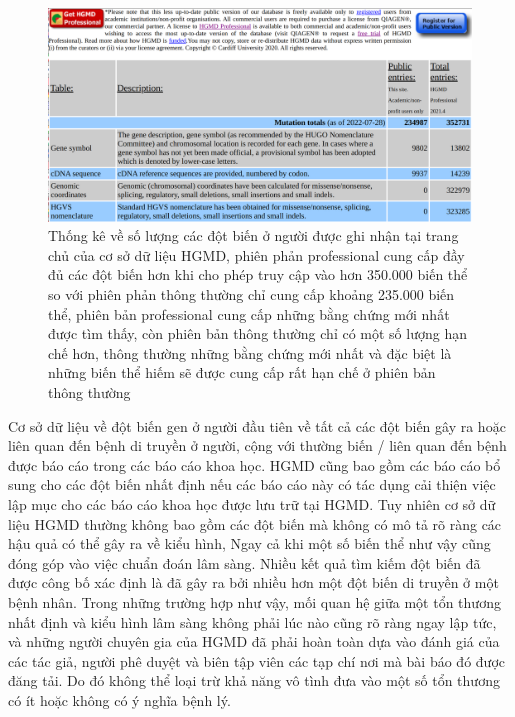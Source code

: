 \documentclass[../DoAn.tex]{subfiles}
\begin{document}
\begin{figure}
\centering
\includegraphics[width=1\linewidth]{Hinh_ve/stat_mutationHGMD.png}
\caption{Thống kê về số lượng các đột biến ở người được ghi nhận tại trang chủ của cơ sở dữ liệu HGMD, phiên phản professional cung cấp đầy đủ các đột biến hơn khi cho phép truy cập vào hơn 350.000 biến thể so với phiên phản thông thường chỉ cung cấp khoảng 235.000 biến thể, phiên bản professional cung cấp những bằng chứng mới nhất được tìm thấy, còn phiên bản thông thường chỉ có một số lượng hạn chế hơn, thông thường những bằng chứng mới nhất và đặc biệt là những biến thể hiếm sẽ được cung cấp rất hạn chế ở phiên bản thông thường}
\label{fig:hgmdstat}
\end{figure}

Cơ sở dữ liệu về đột biến gen ở người đầu tiên về tất cả các đột biến gây ra hoặc liên quan đến bệnh di truyền ở người, cộng với thường biến / liên quan đến bệnh được báo cáo trong các báo cáo khoa học. HGMD cũng bao gồm các báo cáo bổ sung cho các đột biến nhất định nếu các báo cáo này có tác dụng cải thiện việc lập mục cho các báo cáo khoa học được lưu trữ tại HGMD. Tuy nhiên cơ sở dữ liệu HGMD thường không bao gồm các đột biến mà không có mô tả rõ ràng các hậu quả có thể gây ra về kiểu hình, Ngay cả khi một số biến thể như vậy cũng đóng góp vào việc chuẩn đoán lâm sàng. Nhiều kết quả tìm kiếm đột biến đã được công bố xác định là đã gây ra bởi nhiều hơn một đột biến di truyền ở một bệnh nhân. Trong những trường hợp như vậy, mối quan hệ giữa một tổn thương nhất định và kiểu hình lâm sàng không phải lúc nào cũng rõ ràng ngay lập tức, và những người chuyên gia của HGMD đã phải hoàn toàn dựa vào đánh giá của các tác giả, người phê duyệt và biên tập viên các tạp chí nơi mà bài báo đó được đăng tải. Do đó không thể loại trừ khả năng vô tình đưa vào một số tổn thương có ít hoặc không có ý nghĩa bệnh lý. 
\end{document}
